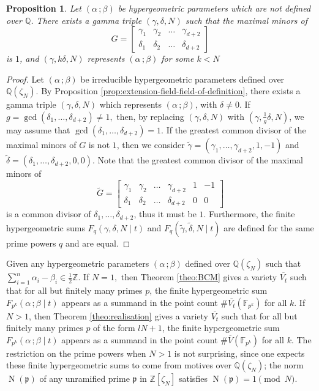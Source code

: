 \documentclass[11pt, reqno]{amsart}
\theoremstyle{plain}
\newtheorem{prop}[theo]{Proposition}
\theoremstyle{definition}
\newcommand{\Z}{\mathbb{Z}}
\newcommand{\Q}{\mathbb{Q}}
\newcommand{\F}{\mathbb{F}}
\newcommand{\ga}{\gamma}
\newcommand{\be}{\beta}
\newcommand{\al}{\alpha}
\begin{document}
\begin{prop}\label{prop:maximal-minors}
Let  $(\al \,; \be)$ be hypergeometric parameters which are not defined over $\Q$. There exists a gamma triple $(\ga,\delta,N)$ such that the maximal minors of
\[
G= \begin{bmatrix}
\ga_1 &\ga_2 & \dots &\ga_{d+2} \\
\delta_1& \delta_2 &  \dots & \delta_{d+2} 
\end{bmatrix}
\]
is $1$, and $(\ga,k\delta,N)$ represents $(\al \, ; \be)$ for some $k < N$
\end{prop}
\begin{proof}
Let $(\al \, ; \be)$ be irreducible hypergeometric parameters defined over $\Q(\zeta_N)$. 
By Proposition \ref{prop:extension-field-field-of-definition}, there exists a gamma triple $(\ga,\delta,N)$ which represents $(\al \, ; \be)$, with $\delta \neq 0$. 
If $g=\gcd(\delta_1, \dots,\delta_{d+2}) \neq 1,$ then, by replacing $(\ga,\delta,N)$ with $(\ga,\frac{1}{g} \delta,N)$, we may assume that $\gcd(\delta_1,\dots,\delta_{d+2})=1$.
If the greatest common divisor of the maximal minors of $G$ is not $ 1$, then we consider $\tilde{\ga}=(\ga_{1},\dots, \ga_{d+2},1,-1)$ and $\tilde{\delta}=(\delta_{1},\dots, \delta_{d+2},0,0)$. Note that the greatest common divisor of the maximal minors of 
\[
\tilde{G}= \begin{bmatrix}
\ga_1 &\ga_2 & \dots &\ga_{d+2} & 1 & -1 \\
\delta_1& \delta_2 &  \dots & \delta_{d+2} & 0 &0
\end{bmatrix}
\]
is a common divisor of $\delta_1,\dots,\delta_{d+2}$, thus it must be $1$.
Furthermore, the finite hypergeometric sums $F_q(\ga,\delta,N \mid t)$ and $F_q(\tilde{\ga},\tilde{\delta},N \mid t)$ are defined for the same prime powers $q$ and are equal.
\end{proof}

Given any hypergeometric parameters $(\al \, ; \be)$ defined over $\Q(\zeta_N)$ such that $\sum_{i=1}^n \al_i -\be_i \in \frac{1}{2}\mathbb{Z}$. 
If $N=1,$ then Theorem \ref{theo:BCM} gives a variety $\overline{V_t}$ such that for all but finitely many primes $p$, the finite hypergeometric sum $F_{p^k}(\al \, ; \be \mid t)$ appears as a summand in the point count $\#\overline{V_t}(\F_{p^k})$ for all $k$.   
If $N>1$, then Theorem \ref{theo:realisation} gives a variety $\overline{V_t}$ such that for all but finitely many primes $p$ of the form $lN+1$, the finite hypergeometric sum $F_{p^k}(\al \, ; \be \mid t)$ appears as a summand in the point count $\#\overline{V}(\F_{p^k})$ for all $k$.   
The restriction on the prime powers when $N>1$ is not surprising, since one expects these finite hypergeometric sums to come from motives over $\Q(\zeta_N)$; the norm $\operatorname{N}(\mathfrak{p})$ of any unramified prime $\mathfrak{p}$ in $\Z[\zeta_N]$ satisfies $\operatorname{N}(\mathfrak{p}) =1 \pmod{N}$.
\end{document}
